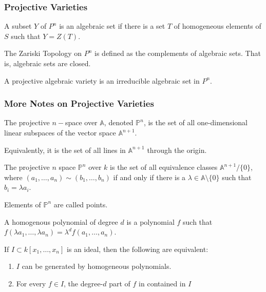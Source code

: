 \documentclass[crop=false,class=book,oneside]{standalone}
\begin{document}
\subsubsection{Projective Varieties}
\begin{definition}
A subset $Y$ of $P^n$ is an algebraic set if there is a set $T$ of homogeneous elements of $S$ such that $Y=Z(T)$.
\end{definition}
\begin{definition}
The Zariski Topology on $P^n$ is defined as the complements of algebraic sets. That is, algebraic sets are closed.
\end{definition}
\begin{definition}
A projective algebraic variety is an irreducible algebraic set in $P^n$.
\end{definition}
\subsubsection{More Notes on Projective Varieties}
\begin{definition}
The projective $n-$space over $\mathbb{A}$, denoted $\mathbb{P}^n$, is the set of all one-dimensional linear subspaces of the vector space $\mathbb{A}^{n+1}$.
\end{definition}
\begin{remark}
Equivalently, it is the set of all lines in $\mathbb{A}^{n+1}$ through the origin.
\end{remark}
\begin{definition}
The projective $n$ space $\mathbb{P}^{n}$ over $k$ is the set of all equivalence classes $\mathbb{A}^{n+1}/\{0\}$, where $(a_1,\hdots, a_n)\sim (b_1,\hdots, b_n)$ if and only if there is a $\lambda\in\mathbb{A}\setminus\{0\}$ such that $b_{i}=\lambda a_{i}$.
\end{definition}
\begin{remark}
Elements of $\mathbb{P}^{n}$ are called points.
\end{remark}
\begin{definition}
A homogenous polynomial of degree $d$ is a polynomial $f$ such that $f(\lambda a_1,\hdots, \lambda a_n) = \lambda^d f(a_1,\hdots, a_n)$.
\end{definition}
\begin{theorem}
If $I\subset k[x_1,\hdots ,x_n]$ is an ideal, then the following are equivalent:
\begin{enumerate}
    \item $I$ can be generated by homogeneous polynomials.
    \item For every $f\in I$, the degree-$d$ part of $f$ in contained in $I$
\end{enumerate}
\end{theorem}
\end{document}
